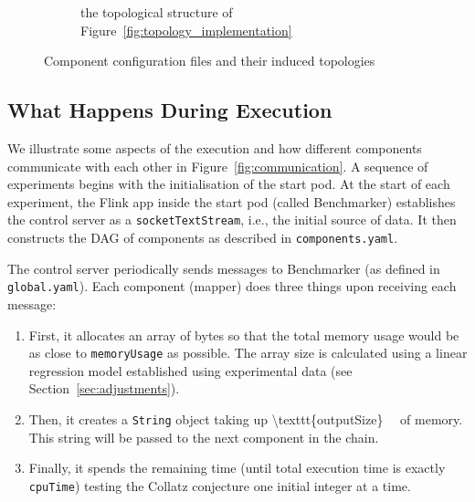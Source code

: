 \documentclass{article}
\begin{document}
\begin{figure}
\begin{subfigure}[b]{0.49\textwidth}
    \caption{the topological structure of
      Figure~\ref{fig:topology_implementation}}
    \label{fig:after_topology}
  \end{subfigure}
  \caption{Component configuration files and their induced topologies}
\end{figure}

\subsection{What Happens During Execution} \label{sec:execution}

We illustrate some aspects of the execution and how different components
communicate with each other in Figure~\ref{fig:communication}. A sequence of
experiments begins with the initialisation of the start pod. At the start of
each experiment, the Flink app inside the start pod (called Benchmarker)
establishes the control server as a \texttt{socketTextStream}, i.e., the initial
source of data. It then constructs the DAG of components as described in
\texttt{components.yaml}.

The control server periodically sends messages to Benchmarker (as defined in
\texttt{global.yaml}). Each component (mapper) does three things upon receiving
each message:
\begin{enumerate}
\item First, it allocates an array of bytes so that the total memory usage would
  be as close to \texttt{memoryUsage} as possible. The array size is calculated
  using a linear regression model established using experimental data (see
  Section~\ref{sec:adjustments}).
\item Then, it creates a \texttt{String} object taking up \SI[number-math-rm =
  \mathnormal, parse-numbers = false]{\texttt{outputSize}}{\kibi\byte} of
  memory. This string will be passed to the next component in the chain.
\item Finally, it spends the remaining time (until total execution time is
  exactly \texttt{cpuTime}) testing the Collatz conjecture \cite{collatz} one
  initial integer at a time.
\end{enumerate}
\end{document}
